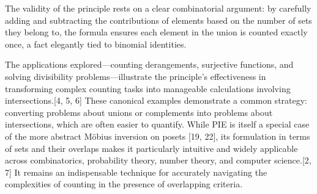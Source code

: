 \documentclass[11pt]{amsart}
\theoremstyle{plain}
\theoremstyle{definition}
\theoremstyle{remark}
\begin{document}
The validity of the principle rests on a clear combinatorial argument: by carefully adding and subtracting the contributions of elements based on the number of sets they belong to, the formula ensures each element in the union is counted exactly once, a fact elegantly tied to binomial identities.

The applications explored—counting derangements, surjective functions, and solving divisibility problems—illustrate the principle's effectiveness in transforming complex counting tasks into manageable calculations involving intersections.[4, 5, 6] These canonical examples demonstrate a common strategy: converting problems about unions or complements into problems about intersections, which are often easier to quantify. While PIE is itself a special case of the more abstract M\"obius inversion on posets [19, 22], its formulation in terms of sets and their overlaps makes it particularly intuitive and widely applicable across combinatorics, probability theory, number theory, and computer science.[2, 7] It remains an indispensable technique for accurately navigating the complexities of counting in the presence of overlapping criteria.

\printbibliography
\end{document}
